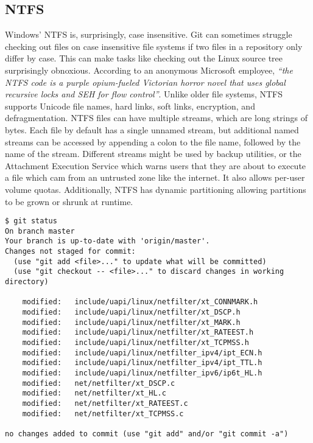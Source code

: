 \documentclass[10pt,conference,draftclsnofoot,onecolumn]{IEEEtran}
\begin{document}
\subsection{NTFS}
Windows' NTFS is, surprisingly, case insensitive. Git can sometimes struggle checking out files on case insensitive file systems if two files in a repository only differ by case. This can make tasks like checking out the Linux source tree surprisingly obnoxious. According to an anonymous Microsoft employee, \textit{``the NTFS code is a purple opium-fueled Victorian horror novel that uses global recursive locks and SEH for flow control''}\cite{windows-kernel-rant}. Unlike older file systems, NTFS supports Unicode file names, hard links, soft links, encryption, and defragmentation. NTFS files can have multiple streams, which are long strings of bytes. Each file by default has a single unnamed stream, but additional named streams can be accessed by appending a colon to the file name, followed by the name of the stream. Different streams might be used by backup utilities, or the Attachment Execution Service which warns users that they are about to execute a file which cam from an untrusted zone like the internet. It also allows per-user volume quotas. Additionally, NTFS has dynamic partitioning allowing partitions to be grown or shrunk at runtime\cite{2_russinovich_solomon_ionescu_2012}.

\begin{lstlisting}
$ git status
On branch master
Your branch is up-to-date with 'origin/master'.
Changes not staged for commit:
  (use "git add <file>..." to update what will be committed)
  (use "git checkout -- <file>..." to discard changes in working directory)

    modified:   include/uapi/linux/netfilter/xt_CONNMARK.h
    modified:   include/uapi/linux/netfilter/xt_DSCP.h
    modified:   include/uapi/linux/netfilter/xt_MARK.h
    modified:   include/uapi/linux/netfilter/xt_RATEEST.h
    modified:   include/uapi/linux/netfilter/xt_TCPMSS.h
    modified:   include/uapi/linux/netfilter_ipv4/ipt_ECN.h
    modified:   include/uapi/linux/netfilter_ipv4/ipt_TTL.h
    modified:   include/uapi/linux/netfilter_ipv6/ip6t_HL.h
    modified:   net/netfilter/xt_DSCP.c
    modified:   net/netfilter/xt_HL.c
    modified:   net/netfilter/xt_RATEEST.c
    modified:   net/netfilter/xt_TCPMSS.c

no changes added to commit (use "git add" and/or "git commit -a")
\end{lstlisting}
\end{document}
